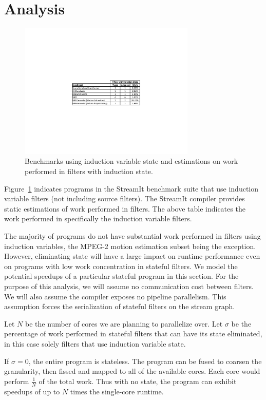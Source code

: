 \section{Analysis}

\begin{figure}[t]
\includegraphics[width=3.3in]{figures/induction-benchmarks.pdf}
\caption{Benchmarks using induction variable state and estimations on work performed in filters with induction state.\protect\label{fig:benchmarks}}
\end{figure}

Figure~\ref{fig:benchmarks} indicates programs in the StreamIt benchmark suite that use induction variable filters (not including source filters).  The StreamIt compiler provides static estimations of work performed in filters.  The above table indicates the work performed in specifically the induction variable filters.

The majority of programs do not have substantial work performed in filters using induction variables, the MPEG-2 motion estimation subset being the exception.  However, eliminating state will have a large impact on runtime performance even on programs with low work concentration in stateful filters.  We model the potential speedups of a particular stateful program in this section.  For the purpose of this analysis, we will assume no communication cost between filters.  We will also assume the compiler exposes no pipeline parallelism.  This assumption forces the serialization of stateful filters on the stream graph.

Let $N$ be the number of cores we are planning to parallelize over.  Let $\sigma$ be the percentage of work performed in stateful filters that can have its state eliminated, in this case solely filters that use induction variable state.  

If $\sigma = 0$, the entire program is stateless.  The program can be fused to coarsen the granularity, then fissed and mapped to all of the available cores.  Each core would perform $\frac{1}{N}$ of the total work.  Thus with no state, the program can exhibit speedups of up to $N$ times the single-core runtime.

